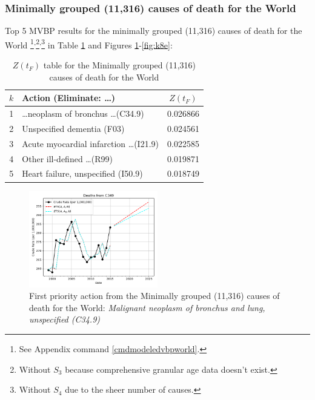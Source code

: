 \documentclass[10pt, a4paper, twocolumn]{IEEEconf}
\newcommand\footnotesstartsep{}
\newcommand\footnotescontinue{\textsuperscript{,}}
\begin{document}
\clearpage

\subsubsection{Minimally grouped (11,316) causes of death for the World}

Top 5 MVBP results for the minimally grouped (11,316) causes of death for the World \citep{whomortality,icd10vol1}\footnotesstartsep\footnote{See Appendix command \ref{cmdmodeledvbpworld}.}\footnotescontinue\footnote{\label{no_s3}Without $S_3$ because comprehensive granular age data doesn't exist.}\footnotescontinue\footnote{Without $S_4$ due to the sheer number of causes.} in Table \ref{table:ztable8} and Figures \ref{fig:k8a}-\ref{fig:k8e}:

\begin{table}[H]
  \centering
  \begin{tabular}{clc}
    \toprule
      $k$ & Action (Eliminate: \ldots) & $Z(t_F)$ \\
    \midrule
      1 & \ldots neoplasm of bronchus \ldots (C34.9) & 0.026866 \\
      2 &                 Unspecified dementia (F03) & 0.024561 \\
      3 & Acute myocardial infarction \ldots (I21.9) & 0.022585 \\
      4 &             Other ill-defined \ldots (R99) & 0.019871 \\
      5 &         Heart failure, unspecified (I50.9) & 0.018749 \\
    \bottomrule
  \end{tabular}
  \caption{$Z(t_F)$ table for the Minimally grouped (11,316) causes of death for the World}
  \label{table:ztable8}
\end{table}

\begin{figure}[H]
  \centering
  \includegraphics[width=0.5\textwidth]{results/WORLD_ICD10_MINIMALLY_GROUPED/C349_ets.png}
  \caption{First priority action from the Minimally grouped (11,316) causes of death for the World: \textit{Malignant neoplasm of bronchus and lung, unspecified (C34.9)}}\label{fig:k8a}
\end{figure}
\end{document}

